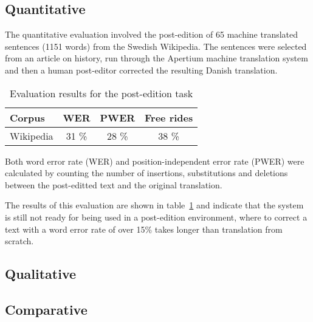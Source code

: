 \documentclass[11pt]{article}
\begin{document}
\subsection{Quantitative}

The quantitative evaluation involved the post-edition of 65 machine translated
sentences (1151 words) from the Swedish Wikipedia. The sentences were selected from an 
article on history, run through the Apertium machine translation system and then a human
post-editor corrected the resulting Danish translation.

\begin{table}
\centering
\begin{tabular}{|l|c|c|c|}
\hline
Corpus    & WER & PWER & Free rides\\
\hline
Wikipedia & 31 \% & 28 \%  & 38 \% \\
\hline
\end{tabular}
    \caption{Evaluation results for the post-edition task}
    \label{table:quanteval}
\end{table}

Both word error rate (WER) and position-independent error rate (PWER) were 
calculated by counting the number of insertions, substitutions and deletions
between the post-editted text and the original translation.

The results of this evaluation are shown in table~\ref{table:quanteval} and 
indicate that the system is still not ready for being used in a post-edition 
environment, where to correct a text with a word error rate of over 15\% takes
longer than translation from scratch.

\subsection{Qualitative}




\subsection{Comparative}

\end{document}
